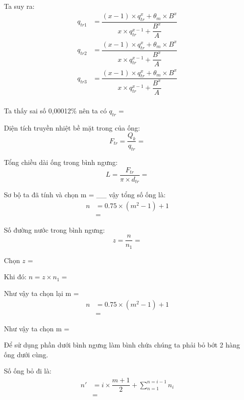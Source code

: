 Ta suy ra:
\begin{equation*}
	\begin{split}
		q_{tr1} &= \dfrac{(x - 1)\times q_{tr}^{x} + \theta_{m}\times B^{x}}{x\times q_{tr}^{x-1} + \dfrac{B^{x}}{A}}\\
		q_{tr2} &= \dfrac{(x - 1)\times q_{tr}^{x} + \theta_{m}\times B^{x}}{x\times q_{tr}^{x-1} + \dfrac{B^{x}}{A}}\\	
		q_{tr3} &= \dfrac{(x - 1)\times q_{tr}^{x} + \theta_{m}\times B^{x}}{x\times q_{tr}^{x-1} + \dfrac{B^{x}}{A}}\\	
	\end{split}
\end{equation*}

Ta thấy sai số 0,00012\% nên ta có $q_{tr}$ = 

Diện tích truyền nhiệt bề mặt trong của ống:
\begin{equation*}
	F_{tr} = \dfrac{Q_{k}}{q_{tr}} = 
\end{equation*}

Tổng chiều dài ống trong bình ngưng:
\begin{equation*}
	L = \dfrac{F_{tr}}{\pi\times d_{tr}} = 
\end{equation*}

Sơ bộ ta đã tính và chọn m = \_\_ vậy tổng số ống là:
\begin{equation*}
	\begin{split}
		n &= 0.75\times (m^2 - 1) + 1\\
		&=
	\end{split}
\end{equation*}

Số đường nước trong bình ngưng:
\begin{equation*}
	z = \dfrac{n}{n_{1}} = 
\end{equation*}

Chọn $z$ = 

Khi đó: $n = z\times n_{1} = $

Như vậy ta chọn lại m = 
\begin{equation*}
	\begin{split}
		n &= 0.75\times (m^2 - 1) + 1\\
		&=  
	\end{split}
\end{equation*}

Như vậy ta chọn m =

Để sử dụng phần dưới bình ngưng làm bình chứa chúng ta phải bỏ bớt 2 hàng ống dưới cùng.

Số ống bỏ đi là:
\begin{equation*}
	\begin{split}
		n' &= i\times \dfrac{m + 1}{2} + \sum_{n=1}^{n=i-1}n_{i}\\
		&=  
	\end{split}
\end{equation*}


